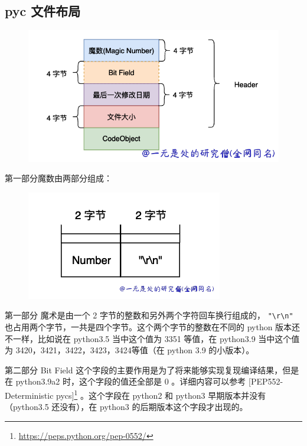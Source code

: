\subsection{pyc 文件布局}

    \begin{figure}[h]
        \centering
            \includegraphics[scale=.35]{images/38-pyc.png}
						\caption{ }
        \label{fig:my_label}
    \end{figure}
    
第一部分魔数由两部分组成：

    \begin{figure}[h]
        \centering
            \includegraphics[scale=.3]{images/37-pyc.png}
						\caption{ }
        \label{fig:my_label}
    \end{figure}
第一部分 魔术是由一个 2 字节的整数和另外两个字符回车换行组成的， \verb|"\r\n"|  也占用两个字节，一共是四个字节。这个两个字节的整数在不同的 python 版本还不一样，比如说在 python3.5 当中这个值为 3351 等值，在 python3.9 当中这个值为 3420，3421，3422，3423，3424等值（在 python 3.9 的小版本）。

第二部分 Bit Field 这个字段的主要作用是为了将来能够实现复现编译结果，但是在 python3.9a2 时，这个字段的值还全部是 0 。详细内容可以参考 [PEP552-Deterministic pycs]\footnote{\href{https://peps.python.org/pep-0552/}{https://peps.python.org/pep-0552/}} 。这个字段在 python2 和 python3 早期版本并没有（python3.5 还没有），在 python3 的后期版本这个字段才出现的。

